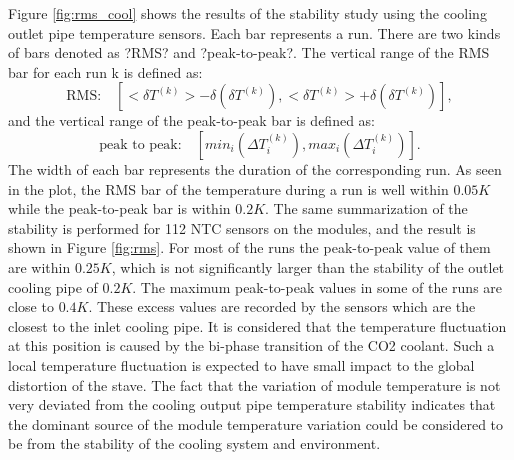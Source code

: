 Figure \ref{fig:rms_cool} shows the results of the stability study using the cooling outlet pipe temperature sensors. Each bar represents a run. There are two kinds of
bars denoted as ?RMS? and ?peak-to-peak?. The vertical range of the RMS bar for each run k is defined
as:
\begin{equation}
\text{RMS:}\quad[<\delta T^{(k)}> - \delta(\delta T^{(k)}), <\delta T^{(k)}> + \delta(\delta T^{(k)})],
\end{equation}
and the vertical range of the peak-to-peak bar is defined as:
\begin{equation}
\text{peak to peak:}\quad[min_{i}(\Delta T^{(k)}_i), max_{i}(\Delta T^{(k)}_i)].
\end{equation}
The width of each bar represents the duration of the corresponding run. As seen in the plot, the RMS bar
of the temperature during a run is well within $0.05 K$ while the peak-to-peak bar is within $0.2 K$.
The same summarization of the stability is performed for 112 NTC sensors on the modules, and the result
is shown in Figure \ref{fig:rms}. For most of the runs the peak-to-peak value of them are within $0.25 K$, which is
not significantly larger than the stability of the outlet cooling pipe of $0.2 K$. The maximum peak-to-peak
values in some of the runs are close to $0.4 K$. These excess values are recorded by the sensors which are
the closest to the inlet cooling pipe. It is considered that the temperature fluctuation at this position is
caused by the bi-phase transition of the CO2 coolant. Such a local temperature fluctuation is expected to
have small impact to the global distortion of the stave. The fact that the variation of module temperature
is not very deviated from the cooling output pipe temperature stability indicates that the dominant source
of the module temperature variation could be considered to be from the stability of the cooling system
and environment.

